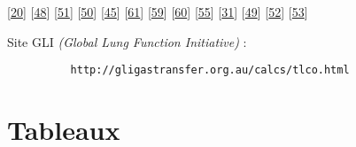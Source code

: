 \documentclass[12pt,]{article}
\begin{document}
{[}\protect\hyperlink{ref-chilton1952mathematical}{20}{]}
{[}\protect\hyperlink{ref-yaron1996utility}{48}{]}
{[}\protect\hyperlink{ref-you1994expiratory}{51}{]}
{[}\protect\hyperlink{ref-krauss2005capnogram}{50}{]}
{[}\protect\hyperlink{ref-hisamuddin2009correlations}{45}{]}
{[}\protect\hyperlink{ref-mieloszyk2014automated}{61}{]}
{[}\protect\hyperlink{ref-kazemi2013frequency}{59}{]}
{[}\protect\hyperlink{ref-kazemi2016new}{60}{]}
{[}\protect\hyperlink{ref-betancourt2014segmented}{55}{]}
{[}\protect\hyperlink{ref-howe2011use}{31}{]}
{[}\protect\hyperlink{ref-egleston1997capnography}{49}{]}
{[}\protect\hyperlink{ref-smalhout1975atlas}{52}{]}
{[}\protect\hyperlink{ref-kelsey1962expiratory}{53}{]}

Site GLI \emph{(Global Lung Function Initiative)} :

\begin{verbatim}
          http://gligastransfer.org.au/calcs/tlco.html
\end{verbatim}

\pagebreak

\hypertarget{tableaux}{%
\section{Tableaux}\label{tableaux}}
\end{document}
